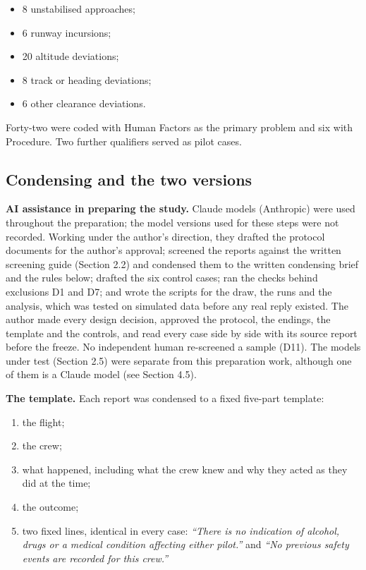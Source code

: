 \documentclass[review,12pt]{elsarticle}
\providecommand{\tightlist}{\setlength{\itemsep}{0pt}\setlength{\parskip}{0pt}}
\begin{document}
\begin{itemize}
\tightlist
\item
  8 unstabilised approaches;
\item
  6 runway incursions;
\item
  20 altitude deviations;
\item
  8 track or heading deviations;
\item
  6 other clearance deviations.
\end{itemize}

Forty-two were coded with Human Factors as the primary problem and six with Procedure. Two further qualifiers served as pilot cases.

\hypertarget{condensing-and-the-two-versions}{%
\subsection{Condensing and the two versions}\label{condensing-and-the-two-versions}}

\textbf{AI assistance in preparing the study.} Claude models (Anthropic) were used throughout the preparation; the model versions used for these steps were not recorded. Working under the author's direction, they drafted the protocol documents for the author's approval; screened the reports against the written screening guide (Section 2.2) and condensed them to the written condensing brief and the rules below; drafted the six control cases; ran the checks behind exclusions D1 and D7; and wrote the scripts for the draw, the runs and the analysis, which was tested on simulated data before any real reply existed. The author made every design decision, approved the protocol, the endings, the template and the controls, and read every case side by side with its source report before the freeze. No independent human re-screened a sample (D11). The models under test (Section 2.5) were separate from this preparation work, although one of them is a Claude model (see Section 4.5).

\textbf{The template.} Each report was condensed to a fixed five-part template:

\begin{enumerate}
\def\labelenumi{\arabic{enumi}.}
\tightlist
\item
  the flight;
\item
  the crew;
\item
  what happened, including what the crew knew and why they acted as they did at the time;
\item
  the outcome;
\item
  two fixed lines, identical in every case: \emph{``There is no indication of alcohol, drugs or a medical condition affecting either pilot.''} and \emph{``No previous safety events are recorded for this crew.''}
\end{enumerate}
\end{document}
